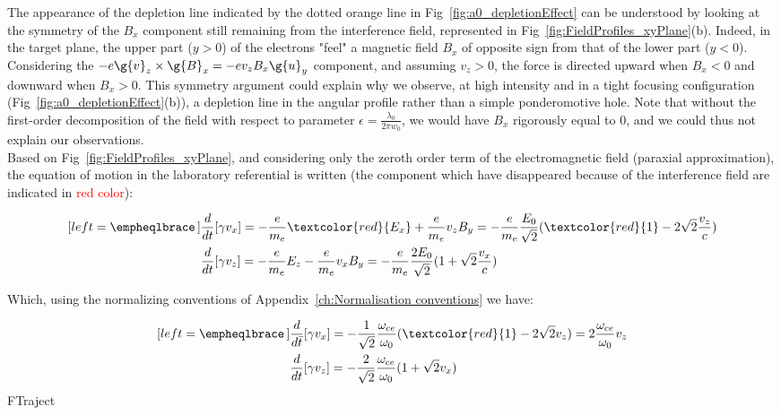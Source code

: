 The appearance of the depletion line indicated by the dotted orange line in Fig~\ref{fig:a0_depletionEffect} can be understood by looking at the symmetry of the $B_x$ component still remaining from the interference field, represented in Fig~\ref{fig:FieldProfiles_xyPlane}(b). Indeed, in the target plane, the upper part ($y>0$) of the electrons "feel" a magnetic field $B_x$ of opposite sign from that of the lower part ($y<0$). Considering the $-e \g{v}_z\times \g{B}_x = -ev_zB_x \g{u}_y$ component, and assuming $v_z>0$, the force is directed upward when $B_x<0$ and downward when  $B_x >0$. This symmetry argument could explain why we observe, at high intensity and in a tight focusing configuration (Fig~\ref{fig:a0_depletionEffect}(b)), a depletion line in the angular profile rather than a simple ponderomotive hole. Note that without the first-order decomposition of the field with respect to parameter $\epsilon = \frac{\lambda_0}{2\pi w_0}$, we would have $B_x$ rigorously equal to $0$, and we could thus not explain our observations.\\

\noindent Based on Fig~\ref{fig:FieldProfiles_xyPlane}, and considering only the zeroth order term of the electromagnetic field (paraxial approximation), the equation of motion in the laboratory referential is written (the component which have disappeared because of the interference field are indicated in \textcolor{red}{red color}):

\begin{subequations}
\label{eq:EquationGyro-1}
\begin{align}[left = \empheqlbrace\,]
&\frac{d}{dt}[\gamma v_x] =- \frac{e}{m_e}\textcolor{red}{E_x} + \frac{e}{m_e}v_zB_y=- \frac{e}{m_e}\frac{E_0}{\sqrt{2}}(\textcolor{red}{1} - 2\sqrt{2}\frac{v_z}{c}) \label{gyro-1} \\
&\frac{d}{dt}[\gamma v_z] =- \frac{e}{m_e}E_z - \frac{e}{m_e}v_xB_y=- \frac{e}{m_e}\frac{2E_0}{\sqrt{2}}(1 + \sqrt{2}\frac{v_x}{c})  \label{gyro-3} 
\end{align}
\end{subequations}

\noindent Which, using the normalizing conventions of Appendix~\ref{ch:Normalisation conventions} we have:

\begin{subequations}
\label{eq:EquationGyro-norm}
\begin{align}[left = \empheqlbrace\,]
&  \frac{d}{d\bar{t}}[\gamma v_x] =- \frac{1}{\sqrt{2}}\frac{\omega_{ce}}{\omega_0}(\textcolor{red}{1} - 2\sqrt{2}v_z)=2 \frac{\omega_{ce}}{\omega_0}v_z \label{gyro-1} \\
&   \frac{d}{dt}[\gamma v_z] =- \frac{2}{\sqrt{2}}\frac{\omega_{ce}}{\omega_0}(1 + \sqrt{2}v_x)  \label{gyro-3} 
\end{align}
\end{subequations}FTraject




